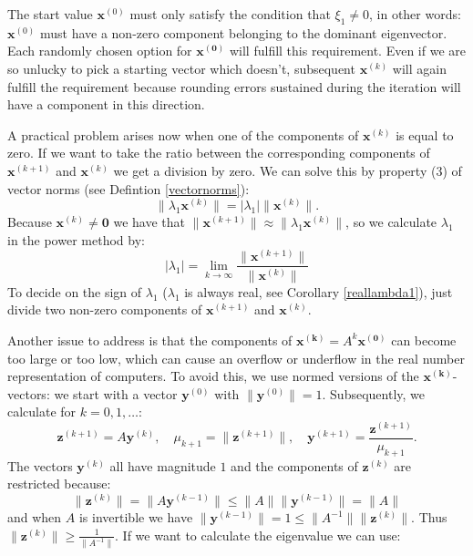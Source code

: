 \documentclass[a4paper,11pt]{report}
\begin{document}
The start value $\mathbf{x}^{(0)}$ must only satisfy the condition that $\xi_1 \not = 
0$, in other words: $\mathbf{x}^{(0)}$ must have a non-zero component belonging to the 
dominant eigenvector. Each randomly chosen option for  $\mathbf{x^{(0)}}$ 
will fulfill this requirement. Even if we are so unlucky to pick a starting 
vector which doesn't, subsequent $\mathbf{x}^{(k)}$ will again fulfill the 
requirement
because rounding errors sustained during the iteration will have a component in 
this direction.

A practical problem arises now when one of the components of $\mathbf{x}^{(k)}$ 
is equal to zero. If we want to take the ratio between the corresponding 
components of $\mathbf{x}^{(k+1)}$ and $\mathbf{x}^{(k)}$ we get a division by 
zero. We can solve this by property (3) of vector norms (see Defintion \ref{vectornorms}): 
$$\|\lambda_1\mathbf{x}^{(k)}\| = |\lambda_1|\|\mathbf{x}^{(k)}\|.$$
Because $\mathbf{x}^{(k)} \not = \mathbf{0}$ we have that $\|\mathbf{x}^{(k+1)}\| \approx \|\lambda_1\mathbf{x}^{(k)}\|$, 
so we calculate
$\lambda_1$ in the power method by:
$$|\lambda_1| = \lim_{k\to\infty}\frac{\|\mathbf{x}^{(k+1)}\|}{\|\mathbf{x}^{(k)}\| }$$
To decide on the sign of $\lambda_1$ ($\lambda_1$ is always real, see Corollary \ref{reallambda1}), just divide two non-zero components of $\mathbf{x}^{(k+1)}$ and 
$\mathbf{x}^{(k)}$.

Another issue to address is that the components of $\mathbf{x^{(k)}} = A^k\mathbf{x^{(0)}}$ 
can become too large or too low, which can cause an overflow or underflow in the 
real number representation of computers. To avoid this, we use 
normed versions of the $\mathbf{x^{(k)}}$-vectors: we start with a vector $\mathbf{y}^{(0)}$ 
with $\|\mathbf{y}^{(0)}\|=1$. Subsequently, we calculate for $k = 0, 1, 
\ldots$:
$$\mathbf{z}^{(k+1)} = A\mathbf{y}^{(k)}, \quad \mu_{k+1} = \|\mathbf{z}^{(k+1)}\|, \quad \mathbf{y}^{(k+1)}=
\frac{\mathbf{z}^{(k+1)}}{\mu_{k+1}}.$$ 
The vectors $\mathbf{y}^{(k)}$ all have magnitude $1$ and the components of $\mathbf{z}^{(k)}$ 
are restricted because:
$$\|\mathbf{z}^{(k)}\| = \|A\mathbf{y}^{(k-1)}\| \leq \|A\| 
\|\mathbf{y}^{(k-1)}\| = \|A\|$$
and when $A$ is invertible we have $\|\mathbf{y}^{(k-1)}\| = 1 \leq \|A^{-1}\|\|\mathbf{z}^{(k)}\|.$ 
Thus $\|\mathbf{z}^{(k)}\| \geq \frac{1}{\|A^{-1}\|}$.
If we want to calculate the eigenvalue we can use:
\end{document}
